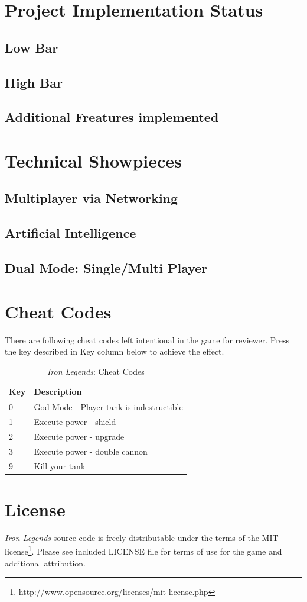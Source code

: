 \documentclass[letterpaper,11pt,twoside]{article}
\begin{document}
\section{Project Implementation Status}

\subsection{Low Bar}

\subsection{High Bar}

\subsection{Additional Freatures implemented}

\section{Technical Showpieces}

\subsection{Multiplayer via Networking}

\subsection{Artificial Intelligence}

\subsection{Dual Mode: Single/Multi Player}

\section{Cheat Codes}

There are following cheat codes left intentional in the game for reviewer.
Press the key described in Key column below to achieve the effect.

\begin{table}[htb]
	\centering
		\begin{tabular}{l|l}
		  \toprule
			Key & Description \\
			\midrule
            0 & God Mode - Player tank is indestructible \\
            1 & Execute power - shield \\
            2 & Execute power - upgrade \\
            3 & Execute power - double cannon \\
            9 & Kill your tank \\
			\bottomrule
		\end{tabular}
	\caption{\emph{Iron Legends}: Cheat Codes}
\end{table}


\section{License}
\emph{Iron Legends} source code is freely distributable under the terms of the MIT license\footnote{http://www.opensource.org/licenses/mit-license.php}.
Please see included LICENSE file for terms of use for the game and additional attribution.
\end{document}

